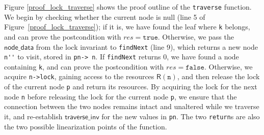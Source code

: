 \documentclass[a4paper,UKenglish,cleveref, autoref, thm-restate]{lipics-v2021}
\newcommand{\than}[1]{\textbf{\textcolor{blue}{[Than: #1]}}}
\begin{document}
Figure \ref{proof_lock_traverse} shows the proof outline of the \texttt{traverse} function.
We begin by checking whether the current node is null (line 5 of Figure~\ref{proof_lock_traverse}); if it is, we have found the leaf where \lstinline{k} belongs, and can prove the postcondition with $\mathit{res} = \texttt{true}$. Otherwise, we pass the $\mathsf{node\_data}$ from the lock invariant to \lstinline{findNext} (line 9), which returns a new node \lstinline{n''} to visit, stored in \lstinline{pn-> n}. If \lstinline{findNext} returns 0, we have found a node containing \lstinline{k}, and can prove the postcondition with $\mathit{res} = \mathtt{false}$. Otherwise, we acquire \lstinline{n->lock}, gaining access to the resources $\mathsf{R}(\texttt{n})$, and then release the lock of the current node \texttt{p} and return its resources. %
By acquiring the lock for the next node \texttt{n} before releasing the lock for the current node \texttt{p}, we ensure that the connection between the two nodes remains intact and unaltered while we traverse it, and re-establish $\mathsf{traverse\_inv}$ for the new values in \lstinline{pn}. 
The two \lstinline{return}s are also the two possible linearization points of the function.

%		 
%		 
%
\end{document}
